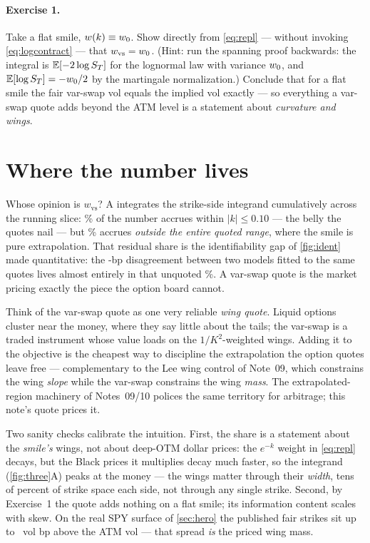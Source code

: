 \documentclass[11pt]{article}
\newcommand{\wvs}{w_{\mathrm{vs}}}
\begin{document}
\paragraph{Exercise 1.}
Take a flat smile, $w(k)\equiv w_0$.  Show directly from
\eqref{eq:repl} --- without invoking \eqref{eq:logcontract} --- that
$\wvs=\tvar_0$.  (Hint: run the spanning proof backwards: the integral
is $\mathbb{E}[-2\log S_T]$ for the lognormal law with variance $w_0$, and
$\mathbb{E}[\log S_T]=-w_0/2$ by the martingale normalization.)  Conclude
that for a flat smile the fair var-swap vol equals the implied vol
exactly --- so everything a var-swap quote adds beyond the ATM level is a
statement about \emph{curvature and wings}.

\section{Where the number lives}
\label{sec:lives}

Whose opinion is $\wvs$?  A integrates the strike-side
integrand cumulatively across the running slice: \vsratmsharepct\% of the
number accrues within $|k|\le0.10$ --- the belly the quotes nail --- but
\vsrwingsharepct\% accrues \emph{outside the entire quoted range}, where
the smile is pure extrapolation.  That residual share is the
identifiability gap of \cref{fig:ident} made quantitative: the
\vsrlvgapbp-bp disagreement between two models fitted to the same
quotes lives almost entirely in that unquoted \vsrwingsharepct\%.  A
var-swap quote is the market pricing exactly the piece the option board
cannot.

\begin{heuristic}
Think of the var-swap quote as one very reliable \emph{wing quote}.
Liquid options cluster near the money, where they say little about the
tails; the var-swap is a traded instrument whose value loads on the
$1/K^{2}$-weighted wings.  Adding it to the objective is the cheapest way
to discipline the extrapolation the option quotes leave free ---
complementary to the Lee wing control of Note~09, which constrains the
wing \emph{slope} while the var-swap constrains the wing \emph{mass}.
The extrapolated-region machinery of Notes~09/10 polices the same
territory for arbitrage; this note's quote prices it.
\end{heuristic}

Two sanity checks calibrate the intuition.  First, the share is a
statement about the \emph{smile's} wings, not about deep-OTM dollar
prices: the $e^{-k}$ weight in \eqref{eq:repl} decays, but the Black
prices it multiplies decay much faster, so the integrand
(\cref{fig:three}A) peaks at the money --- the wings matter through
their \emph{width}, tens of percent of strike space each side,
not through any single strike.  Second, by Exercise~1 the quote adds
nothing on a flat smile; its information content scales with skew.  On
the real SPY surface of \cref{sec:hero} the published fair strikes sit up
to \vsrherospreadbp\ vol bp above the ATM vol --- that spread \emph{is}
the priced wing mass.
\end{document}
